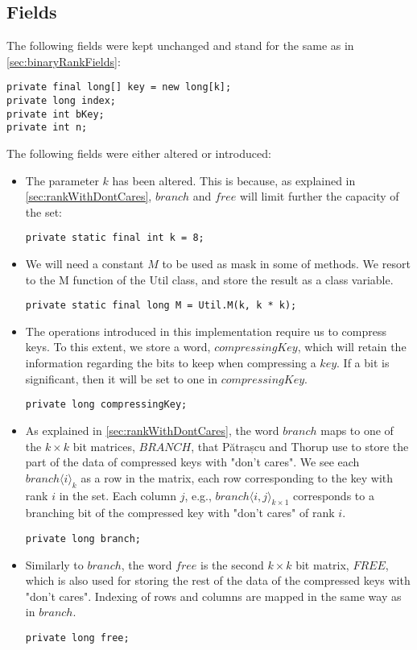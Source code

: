 \subsection{Fields} \label{sec:dontCaresRankFields}
The following fields were kept unchanged and stand for the same as in \ref{sec:binaryRankFields}:
\begin{lstlisting}
private final long[] key = new long[k];
private long index;
private int bKey;
private int n;
\end{lstlisting}

The following fields were either altered or introduced:
\begin{itemize}
    \item
    The parameter $k$ has been altered. This is because, as explained in \ref{sec:rankWithDontCares}, $branch$ and $free$ will limit further the capacity of the set:
    \begin{lstlisting}
private static final int k = 8;
    \end{lstlisting}
    
    \item
    We will need a constant $M$ to be used as mask in some of methods. We resort to the {\ttfamily M} function of the {\ttfamily Util} class, and store the result as a class variable.
    \begin{lstlisting}
private static final long M = Util.M(k, k * k);
    \end{lstlisting}

    \item
    The operations introduced in this implementation require us to compress keys. To this extent, we store a word, $compressingKey$, which will retain the information regarding the bits to keep when compressing a $key$. If a bit is significant, then it will be set to one in $compressingKey$.
    \begin{lstlisting}
private long compressingKey;
    \end{lstlisting}

    \item
    As explained in \ref{sec:rankWithDontCares}, the word $branch$ maps to one of the $k \times k$ bit matrices, $BRANCH$, that Pătrașcu and Thorup use to store the part of the data of compressed keys with "don't cares".
    We see each $branch\langle i \rangle_k$ as a row in the matrix, each row corresponding to the key with rank $i$ in the set.
    Each column $j$, e.g., $branch\langle i, j\rangle_{k \times 1}$ corresponds to a branching bit of the compressed key with "don't cares" of rank $i$.
    \begin{lstlisting}
private long branch;
    \end{lstlisting}
    
    \item
    Similarly to $branch$, the word $free$ is the second $k \times k$ bit matrix, $FREE$, which is also used for storing the rest of the data of the compressed keys with "don't cares". Indexing of rows and columns are mapped in the same way as in $branch$.
    \begin{lstlisting}
private long free;
    \end{lstlisting}
\end{itemize}

